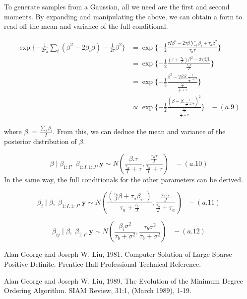 \documentclass[]{article}
\begin{document}
To generate samples from a Gaussian, all we need are the first and
second moments. By expanding and manipulating the above, we can obtain a
form to read off the mean and variance of the full conditional.

\[
\begin{aligned}
\exp \{-\frac{1}{2\tau_a} \sum_i (\beta^2 -2\beta_i\beta) - \frac{1}{2\tau}\beta^2\} &= \exp \{-\frac{1}{2} \frac{\tau I \beta^2 - 2\tau\beta\sum_{i}\beta_i + \tau_a \beta^2}{\tau_a\tau}\} \\
&= \exp \{-\frac{1}{2} \frac{(\tau+ \frac{\tau_a}{I}) \beta^2 - 2\tau\beta \beta.} {\frac{\tau_a\tau}{I}}\}\\ 
&= \exp \{-\frac{1}{2} \frac{\beta^2 - 2\beta \beta. \frac{\tau}{\frac{\tau_a}{I}+\tau}} { \frac{\frac{\tau_a\tau }{I}} {\frac{\tau_a}{I}+\tau}}\}\\
&\propto \exp \{-\frac{1}{2} \frac{(\beta - \beta. \frac{\tau}{\frac{\tau_a}{I}+\tau})^2} { \frac{\frac{\tau_a\tau }{I}} {\frac{\tau_a}{I}+\tau}}\} \;\;\; - (a.9)
\end{aligned}
\]

where \(\beta. = \frac{\sum_i\beta_i}{I}\). From this, we can deduce the
mean and variance of the posterior distribution of \(\beta\).

\[\beta \;|\; \beta_{1:I}, \;\beta_{1:I,1:J}, \boldsymbol{y} \sim N(\frac{\beta.\tau}{\frac{\tau_a}{I}+\tau}, \frac{\frac{\tau_a \tau}{I}}{\frac{\tau_a}{I}+\tau})\;\;\; - (a.10)\]
In the same way, the full conditionals for the other parameters can be
derived.

\[\beta_i \;|\; \beta, \;\beta_{1:I,1:J}, \boldsymbol{y} \sim N(\frac{(\frac{\tau_b}{J} \beta + \tau_a \beta_{i\cdot})}{\tau_a + \frac{\tau_b}{J}},  \frac{\frac{\tau_a\tau_b }{J}} {\frac{\tau_b}{J}+\tau_a})\;\;\; - (a.11)\]

\[\beta_{ij} \;|\; \beta, \;\beta_{1:I}, \boldsymbol{y} \sim N(\frac{\beta_i \sigma^2}{\tau_b + \sigma^2},  \frac{\tau_b \sigma^2}{\tau_b + \sigma^2})\;\;\; - (a.12)\]

\newpage

 \newline 

Alan George and Joseph W. Liu, 1981. Computer Solution of Large Sparse
Positive Definite. Prentice Hall Professional Technical Reference.

Alan George and Joseph W. Liu, 1989. The Evolution of the Minimum Degree
Ordering Algorithm. SIAM Review, 31:1, (March 1989), 1-19.
\end{document}
